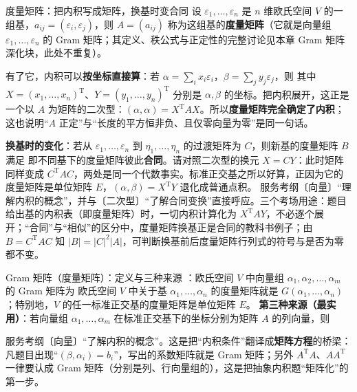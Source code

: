 \begin{fdeep}{度量矩阵：把内积写成矩阵，换基时变合同}
设 $\varepsilon_1,\dots,\varepsilon_n$ 是 $n$ 维欧氏空间 $V$ 的一组基，$a_{ij}=(\varepsilon_i,\varepsilon_j)$，则 $A=(a_{ij})$ 称为这组基的\textbf{度量矩阵}（它就是向量组 $\varepsilon_1,\dots,\varepsilon_n$ 的 Gram 矩阵；其定义、秩公式与正定性的完整讨论见本章 Gram 矩阵深化块，此处不重复）。

有了它，内积可以\textbf{按坐标直接算}：若 $\alpha=\sum_i x_i\varepsilon_i$，$\beta=\sum_j y_j\varepsilon_j$，则
其中 $X=(x_1,\dots,x_n)^{\mathrm T}$、$Y=(y_1,\dots,y_n)^{\mathrm T}$ 分别是 $\alpha,\beta$ 的坐标。把内积展开，这正是一个以 $A$ 为矩阵的二次型：$(\alpha,\alpha)=X^{\mathrm T}AX$。所以\textbf{度量矩阵完全确定了内积}；这也说明“$A$ 正定”与“长度的平方恒非负、且仅零向量为零”是同一句话。

\textbf{换基时的变化}：若从 $\varepsilon_1,\dots,\varepsilon_n$ 到 $\eta_1,\dots,\eta_n$ 的过渡矩阵为 $C$，则新基的度量矩阵 $B$ 满足
即不同基下的度量矩阵彼此\textbf{合同}。请对照二次型的换元 $X=CY$：此时矩阵同样变成 $C^{\mathrm T}AC$，两处是同一个代数事实。标准正交基之所以好算，正因为它的度量矩阵是单位矩阵 $E$，$(\alpha,\beta)=X^{\mathrm T}Y$ 退化成普通点积。
\fbref{}服务考纲〔向量〕“理解内积的概念”，并与〔二次型〕“了解合同变换”直接呼应。三个考场用途：题目给出基的内积表（即度量矩阵）时，一切内积计算化为 $X^{\mathrm T}AY$，不必逐个展开；“合同”与“相似”的区分中，度量矩阵换基正是合同的教科书例子；由 $B=C^{\mathrm T}AC$ 知 $|B|=|C|^{2}|A|$，可判断换基前后度量矩阵行列式的符号与是否为零都不变。
\end{fdeep}

\begin{fdeep}{Gram 矩阵（度量矩阵）：定义与三种来源}
：欧氏空间 $V$ 中向量组 $\alpha_{1},\alpha_{2},\dots,\alpha_{m}$ 的 Gram 矩阵为
欧氏空间 $V$ 中关于基 $\alpha_{1},\dots,\alpha_{n}$ 的度量矩阵就是 $G(\alpha_{1},\dots,\alpha_{n})$；特别地，$V$ 的任一标准正交基的度量矩阵是单位矩阵 $E$。
\textbf{第三种来源（最实用）}：若向量组 $\alpha_{1},\dots,\alpha_{m}$ 在标准正交基下的坐标分别为矩阵 $A$ 的列向量，则

\fbref{}服务考纲〔向量〕“了解内积的概念”。这是把“内积条件”翻译成\textbf{矩阵方程}的桥梁：凡题目出现“$(\beta,\alpha_{i})=b_{i}$”，写出的系数矩阵就是 Gram 矩阵；另外 $A^{\mathrm T}A$、$AA^{\mathrm T}$ 一律要认成 Gram 矩阵（分别是列、行向量组的），这是把抽象内积题“矩阵化”的第一步。
\end{fdeep}

